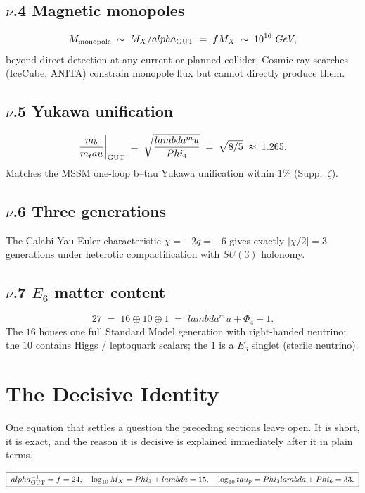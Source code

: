 \documentclass[12pt,a4paper]{article}
\def\mathrm#1{#1}%
\def\mathbf#1{#1}%
\def\text#1{#1}%
\def\alpha{alpha}%
\def\lambda{lambda}%
\def\mu{mu}%
\def\Phi#1{Phi#1}%
\def\tau{tau}%
\def\cdot{ }%
\theoremstyle{definition}
\newcommand{\SU}{\mathrm{SU}}
\begin{document}
\subsection*{$\nu$.4 \quad Magnetic monopoles}
\[
M_{\rm monopole} \;\sim\; M_X / \alpha_{\rm GUT} \;=\; f \cdot M_X \;\sim\; 10^{16}\ \text{GeV},
\]
beyond direct detection at any current or planned collider. Cosmic-ray
searches (IceCube, ANITA) constrain monopole flux but cannot
directly produce them.

\subsection*{$\nu$.5 \quad Yukawa unification}
\[
\frac{m_b}{m_\tau}\bigg|_{\rm GUT} \;=\; \sqrt{\frac{\lambda^\mu}{\Phi_4}} \;=\; \sqrt{8/5} \;\approx\; 1.265.
\]
Matches the MSSM one-loop b--tau Yukawa unification within $1\%$
(Supp.~$\zeta$).

\subsection*{$\nu$.6 \quad Three generations}
The Calabi-Yau Euler characteristic $\chi = -2q = -6$ gives exactly
$|\chi/2| = 3$ generations under heterotic compactification with
$\SU(3)$ holonomy.

\subsection*{$\nu$.7 \quad $E_6$ matter content}
\[
\mathbf{27} \;=\; \mathbf{16} \oplus \mathbf{10} \oplus \mathbf{1}
\;=\; \lambda^\mu + \Phi_4 + 1.
\]
The $\mathbf{16}$ houses one full Standard Model generation with
right-handed neutrino; the $\mathbf{10}$ contains Higgs / leptoquark
scalars; the $\mathbf{1}$ is a $E_6$ singlet (sterile neutrino).

\section*{The Decisive Identity}

\begin{plainbox}
One equation that settles a question the preceding sections leave open. It is short,
it is exact, and the reason it is decisive is explained immediately after it in plain
terms.
\end{plainbox}


\[
\boxed{\;\alpha_{\rm GUT}^{-1} = f = 24,\quad \log_{10}M_X = \Phi_3+\lambda = 15,\quad \log_{10}\tau_p = \Phi_3\lambda+\Phi_6 = 33.\;}
\]
\end{document}
